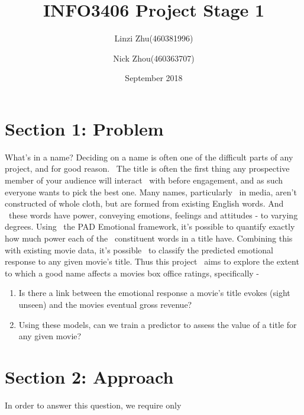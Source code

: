 \documentclass[10pt,a4paper]{article}
\begin{document}
\begin{titlepage}
    \title{INFO3406 Project Stage 1}
    \author{Linzi Zhu(460381996)\\
            \and
            Nick Zhou(460363707)
    }
    \date{September 2018}
    \maketitle
\end{titlepage}
    \begin{tableofcontents}
        \centering
        \tableofcontents
    \end{tableofcontents}
    \pagebreak

    \section{Section 1: Problem}
    What's in a name? Deciding on a name is often one of the difficult parts of any project, and for good reason. \
    The title is often the first thing any prospective member of your audience will interact \
    with before engagement, and as such everyone wants to pick the best one. Many names, particularly \
    in media, aren't constructed of whole cloth, but are formed from existing English words. And \
    these words have power, conveying emotions, feelings and attitudes - to varying degrees. Using \
    the PAD Emotional framework, it's possible to quantify exactly how much power each of the \
    constituent words in a title have. Combining this with existing movie data, it's possible \
    to classify the predicted emotional response to any given movie's title. Thus this project \
    aims to explore the extent to which a good name affects a movies box office ratings, specifically -

    \begin{enumerate}
        \item Is there a link between the emotional response a movie's title evokes (sight unseen) and the movies eventual gross revenue?
        \item Using these models, can we train a predictor to assess the value of a title for any given movie?

    \end{enumerate}

    \section{Section 2: Approach}
    In order to answer this question, we require only
    \newline
\end{document}
